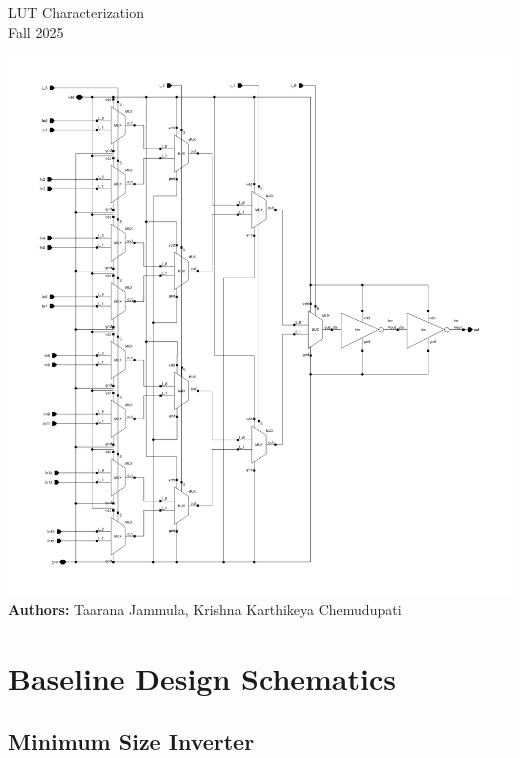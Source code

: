 \documentclass[12pt]{article}
\begin{document}
\begin{titlepage}
    \centering
    \vspace*{0.1cm}
    {\huge LUT Characterization \\[0.5em]}
    {\large Fall 2025 \\[2em]}

    \includegraphics[width=\linewidth]{LUT_sch.png}\\[2em]

    \textbf{Authors:} Taarana Jammula,  Krishna Karthikeya Chemudupati  \\[2em]

    \vfill
\end{titlepage}

\tableofcontents
\newpage

\section{Baseline Design Schematics}

\subsection{Minimum Size Inverter}
\end{document}
